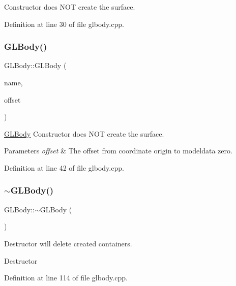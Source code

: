 Constructor does N\+OT create the surface. 

Definition at line 30 of file glbody.\+cpp.

\mbox{\label{class_g_l_body_a6e50d6cb10fbdb81e8aeb64ab3e46a66}} 
\subsubsection{\texorpdfstring{GLBody()}{GLBody()}\hspace{0.1cm}{\footnotesize\ttfamily [2/2]}}
{\footnotesize\ttfamily G\+L\+Body\+::\+G\+L\+Body (\begin{DoxyParamCaption}\item[{Q\+String}]{name,  }\item[{const Q\+Vector3D}]{offset }\end{DoxyParamCaption})}



\mbox{\hyperlink{class_g_l_body}{G\+L\+Body}} Constructor does N\+OT create the surface. 


\begin{DoxyParams}{Parameters}
{\em offset} & The offset from coordinate origin to modeldata zero. \\
\hline
\end{DoxyParams}


Definition at line 42 of file glbody.\+cpp.

\mbox{\label{class_g_l_body_ac6cd2e5f6d0115cf6f6f0ae84c9d91a1}} 
\subsubsection{\texorpdfstring{$\sim$GLBody()}{~GLBody()}}
{\footnotesize\ttfamily G\+L\+Body\+::$\sim$\+G\+L\+Body (\begin{DoxyParamCaption}{ }\end{DoxyParamCaption})\hspace{0.3cm}{\ttfamily [virtual]}}

Destructor will delete created containers.

Destructor 

Definition at line 114 of file glbody.\+cpp.



